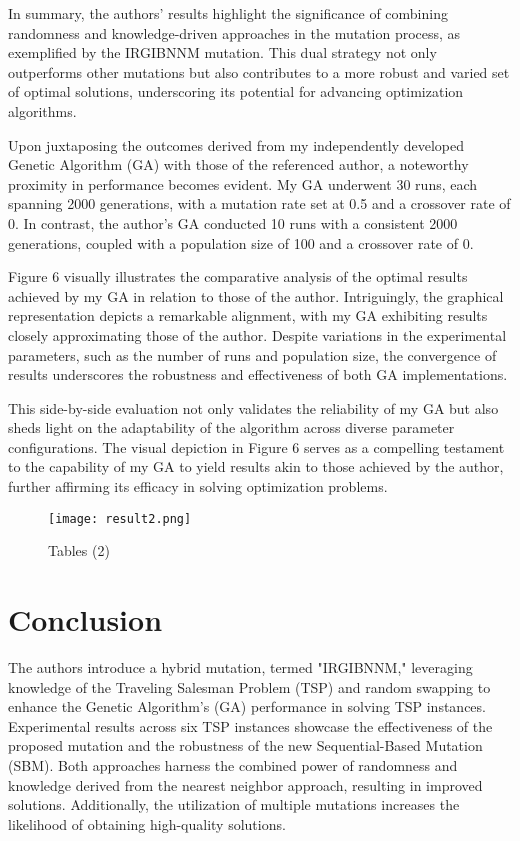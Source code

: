 \documentclass[conference]{IEEEtran}
\begin{document}
In summary, the authors' results highlight the significance of combining randomness and knowledge-driven approaches in the mutation process, as exemplified by the IRGIBNNM mutation. This dual strategy not only outperforms other mutations but also contributes to a more robust and varied set of optimal solutions, underscoring its potential for advancing optimization algorithms.

Upon juxtaposing the outcomes derived from my independently developed Genetic Algorithm (GA) with those of the referenced author, a noteworthy proximity in performance becomes evident. My GA underwent 30 runs, each spanning 2000 generations, with a mutation rate set at 0.5 and a crossover rate of 0. In contrast, the author's GA conducted 10 runs with a consistent 2000 generations, coupled with a population size of 100 and a crossover rate of 0.

Figure 6 visually illustrates the comparative analysis of the optimal results achieved by my GA in relation to those of the author. Intriguingly, the graphical representation depicts a remarkable alignment, with my GA exhibiting results closely approximating those of the author. Despite variations in the experimental parameters, such as the number of runs and population size, the convergence of results underscores the robustness and effectiveness of both GA implementations.

This side-by-side evaluation not only validates the reliability of my GA but also sheds light on the adaptability of the algorithm across diverse parameter configurations. The visual depiction in Figure 6 serves as a compelling testament to the capability of my GA to yield results akin to those achieved by the author, further affirming its efficacy in solving optimization problems.
 
\begin{figure}[t!]
\center
\texttt{[image: result2.png]}
\caption{ Tables (2) }
\label{fig}
\end{figure}

\section{Conclusion}
The authors introduce a hybrid mutation, termed "IRGIBNNM," leveraging knowledge of the Traveling Salesman Problem (TSP) and random swapping to enhance the Genetic Algorithm's (GA) performance in solving TSP instances. Experimental results across six TSP instances showcase the effectiveness of the proposed mutation and the robustness of the new Sequential-Based Mutation (SBM). Both approaches harness the combined power of randomness and knowledge derived from the nearest neighbor approach, resulting in improved solutions. Additionally, the utilization of multiple mutations increases the likelihood of obtaining high-quality solutions.
\end{document}
